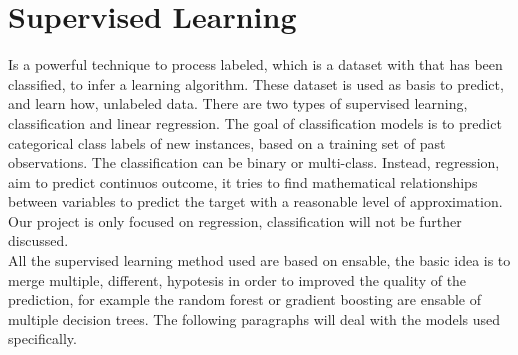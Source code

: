 \documentclass[%
    corpo=12pt,
    twoside,
    oldstyle,
    autoretitolo,
    greek,
    evenboxes,
]{toptesi}
\begin{document}
\section{Supervised Learning}
Is a powerful technique to process labeled, which is a dataset with that has been classified, to infer a learning algorithm. These dataset is used as basis to predict, and learn how, unlabeled data. There are two types of supervised learning, classification and linear regression. The goal of classification models is to predict categorical class labels of new instances, based on a training set of past observations. The classification can be binary or multi-class. Instead, regression, aim to predict continuos outcome, it tries to find mathematical relationships between variables to predict the target with a reasonable level of approximation. Our project is only focused on regression, classification will not be further discussed.\\
All the supervised learning method used are based on ensable, the basic idea is to merge multiple, different, hypotesis in order to improved the quality of the prediction, for example the random forest or gradient boosting are ensable of multiple decision trees. The following paragraphs will deal with the models used specifically.
\end{document}
